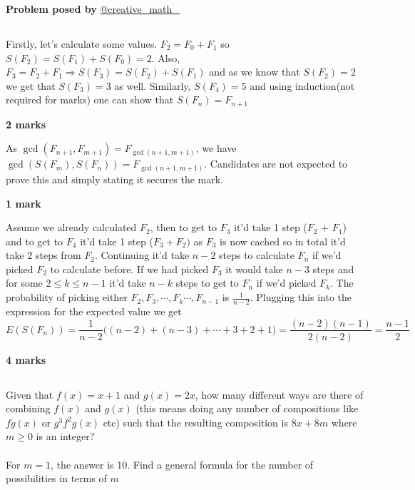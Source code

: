 \documentclass[12pt]{article}
\begin{document}
\begin{flushright}
\textbf{Problem posed by}
\textcolor{RoyalBlue2}{\href{https://www.instagram.com/creative_math_/}{@creative\_math\_}}
\end{flushright}




\subsection*{}
Firstly, let's calculate some values. $F_2 = F_0+F_1$ so $S(F_2) = S(F_1)+S(F_0) = 2$. Also, $F_3 = F_2 + F_1 \Rightarrow S(F_3) = S(F_2)+S(F_1)$ and as we know that $S(F_2) = 2$ we get that $S(F_3) = 3$ as well. Similarly, $S(F_4) = 5$ and using induction(not required for marks) one can show that $S(F_n) = F_{n+1}$
\begin{flushright}
\textbf{2 marks}
\end{flushright} 
As $\gcd(F_{n+1},F_{m+1}) = F_{\gcd(n+1,m+1)}$, we have $\gcd(S(F_m),S(F_n)) = F_{\gcd(n+1,m+1)}$. Candidates are not expected to prove this and simply stating it secures the mark.  
\begin{flushright}
\textbf{1 mark}
\end{flushright}
Assume we already calculated  $F_2$, then to get to $F_3$ it'd take 1 step ($F_2$ + $F_1$) and to get to $F_4$ it'd take 1 step ($F_3 + F_2)$ as $F_3$ is now cached so in total it'd take 2 steps from $F_2$. Continuing it'd take $n-2$ steps to calculate $F_n$ if we'd picked $F_2$ to calculate before. If we had picked $F_3$ it would take $n-3$ steps and for some $2\leq k \leq n-1$ it'd take $n-k$ steps to get to $F_n$ if we'd picked $F_k$. The probability of picking either $F_2,F_3,\cdots, F_k \cdots, F_{n-1}$ is $\frac{1}{n-2}$. Plugging this into the expression for the expected value we get 
$$E(S(F_n)) = \frac{1}{n-2}\bigg( (n-2) + (n-3)+ \cdots + 3 + 2 + 1 \bigg) = \frac{(n-2)(n-1)}{2(n-2)} = \frac{n-1}{2}$$
\begin{flushright}
\textbf{4 marks}
\end{flushright}




\subsection*{}
Given that $f(x) = x+1$ and $g(x) = 2x$, how many different ways are there of combining $f(x)$ and $g(x)$ (this means doing any number of compositions like $fg(x)$ or $g^3f^2g(x)$ etc) such that the resulting composition is $8x+8m$ where $m \geq 0$ is an integer? \\ \\
For $m =1$, the answer is 10. Find a general formula for the number of possibilities in terms of $m$
\end{document}
